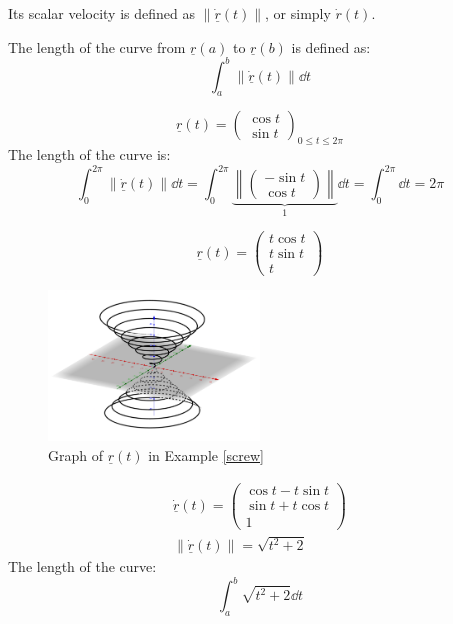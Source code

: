 \documentclass[00_complete]{subfiles}
\begin{document}
Its scalar velocity is defined as $\|\dot{\underline r}(t)\|$, or simply $\dot r(t)$.

The length of the curve from $\underline r(a)$ to $\underline r(b)$ is defined
as:
$$\int_{a}^{b} \|\dot{\underline r}(t)\|\dd{t}$$
\begin{example}
    $$
        \underline r(t)=\begin{pmatrix}
            \cos t \\\sin t
        \end{pmatrix}_{0 \leq t \leq 2\pi}
    $$
    The length of the curve is:
    $$\int_{0}^{2\pi}\|\dot{\underline r}(t)\|\dd{t} =
    \int_{0}^{2\pi}\underbrace{\left\|\begin{pmatrix}
        -\sin t \\ \cos t
    \end{pmatrix}\right\|}_{1}\dd{t} = \int_{0}^{2\pi}\dd{t} = 2 \pi$$
\end{example}
\begin{example}
    \label{screw}
    $$\underline r(t) = \begin{pmatrix}
        t \cos t \\ t \sin t \\ t
    \end{pmatrix}$$
    \begin{figure}[ht]
        \centering
    \includegraphics[width=0.5\textwidth]{corkscrew}
    \caption{Graph of $\underline r(t)$ in Example \ref{screw}}
    \end{figure}
    \begin{gather*}
    \dot{\underline r}(t) = \begin{pmatrix}
        \cos t - t\sin t \\ \sin t + t \cos t \\ 1
    \end{pmatrix} \\
    \|\dot{\underline r}(t)\| = \sqrt{t^2+2}
    \end{gather*}
    The length of the curve:
    $$\int_{a}^{b}\sqrt{t^2+2}\dd{t}$$
\end{example}
\end{document}
